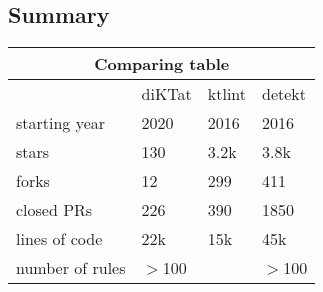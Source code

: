\subsection{Summary}

\begin{center}
\begin{tabular}{ |p{3cm}|p{3cm}|p{3cm}|p{3cm}|  }
\hline
\multicolumn{4}{|c|}{\textbf{Comparing table}} \\
\hline
& diKTat& ktlint &detekt \\
\hline
starting year & 2020 & 2016 & 2016 \\
stars & 130 & 3.2k & 3.8k \\ 
forks & 12 & 299 & 411 \\
closed PRs & 226 & 390 & 1850 \\
lines of code & 22k & 15k & 45k \\
number of rules & $>$100 & \approx 20 & $>$100 \\
\hline

\hline
\end{tabular}
\end{center}